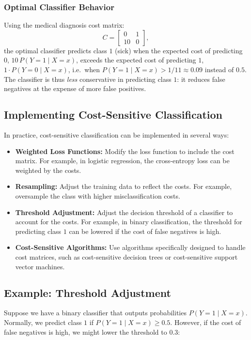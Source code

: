 \begin{notechapter}
\subsubsection{Optimal Classifier Behavior}
Using the medical diagnosis cost matrix:
\[
C = \begin{bmatrix}
0 & 1 \\
10 & 0
\end{bmatrix},
\]
the optimal classifier predicts class \( 1 \) (sick) when the expected cost of predicting \( 0 \), \( 10\,P(Y = 1 \mid X = x) \), exceeds the expected cost of predicting \( 1 \), \( 1\cdot P(Y = 0 \mid X = x) \), i.e.\ when \( P(Y = 1 \mid X = x) > 1/11 \approx 0.09 \) instead of \( 0.5 \). The classifier is thus \emph{less} conservative in predicting class \( 1 \): it reduces false negatives at the expense of more false positives.

\subsection{Implementing Cost-Sensitive Classification}
In practice, cost-sensitive classification can be implemented in several ways:
\begin{itemize}
    \item \textbf{Weighted Loss Functions:} Modify the loss function to include the cost matrix. For example, in logistic regression, the cross-entropy loss can be weighted by the costs.
    \item \textbf{Resampling:} Adjust the training data to reflect the costs. For example, oversample the class with higher misclassification costs.
    \item \textbf{Threshold Adjustment:} Adjust the decision threshold of a classifier to account for the costs. For example, in binary classification, the threshold for predicting class \( 1 \) can be lowered if the cost of false negatives is high.
    \item \textbf{Cost-Sensitive Algorithms:} Use algorithms specifically designed to handle cost matrices, such as cost-sensitive decision trees or cost-sensitive support vector machines.
\end{itemize}

\subsection{Example: Threshold Adjustment}
Suppose we have a binary classifier that outputs probabilities \( P(Y = 1 \mid X = x) \). Normally, we predict class \( 1 \) if \( P(Y = 1 \mid X = x) \geq 0.5 \). However, if the cost of false negatives is high, we might lower the threshold to \( 0.3 \):


\end{notechapter}
